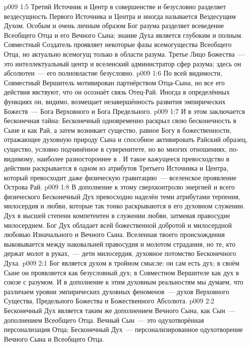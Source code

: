 \vs p009 1:5 \pc Третий Источник и Центр в совершенстве и безусловно разделяет вездесущность Первого Источника и Центра и иногда называется Вездесущим Духом. Особым и очень личным образом Бог разума разделяет всеведение Всеобщего Отца и его Вечного Сына; знание Духа является глубоким и полным. Совместный Создатель проявляет некоторые фазы всемогущества Всеобщего Отца, но актуально всемогущ только в области разума. Третье Лицо Божества~--- это интеллектуальный центр и вселенский администратор сфер разума; здесь он абсолютен~--- его полновластие безусловно.
\vs p009 1:6 По всей видимости, Совместный Вершитель мотивирован партнёрством Отца\hyp{}Сына, но все его действия явствуют, что он осознаёт связь Отец\hyp{}Рай. Иногда в определённых функциях он, видимо, возмещает незавершённость развития эмпирических Божеств~--- Бога Верховного и Бога Предельного.
\vs p009 1:7 \pc И в этом заключается бесконечная тайна: Бесконечный одновременно раскрыл свою бесконечность в Сыне и как Рай, а затем возникает существо, равное Богу в божественности, отражающее духовную природу Сына и способное активировать Райский образец, существо, условно подчинённое в суверенитете, но во многих отношениях, по\hyp{}видимому, наиболее разностороннее в . И такое кажущееся превосходство в действии раскрывается в одном из атрибутов Третьего Источника и Центра, который превосходит даже физическую гравитацию~--- вселенское проявление Острова Рай.
\vs p009 1:8 В дополнение к этому сверхконтролю энергией и всего физического Бесконечный Дух превосходно наделён теми атрибутами терпения, милосердия и любви, которые так тонко раскрываются в его духовном служении. Дух в высшей степени компетентен в служении любви, затмевая правосудие милосердием. Бог Дух обладает всей божественной добротой и милосердной любовью Изначального и Вечного Сына. Вселенная твоего происхождения выковывается между наковальней правосудия и молотом страдания, но те, кто держат молот в руках,~--- дети милосердия, духовное потомство Бесконечного Духа.
\vs p009 2:1 Бог является духом в тройном смысле: он сам есть дух; в своём Сыне он проявляется как безусловный дух; в Совместном Вершителе как дух в союзе с разумом. И в дополнение к этим духовным реальностям мы думаем, что различаем уровни эмпирических духовных феноменов~--- духов Верховного Существа, Предельного Божества и Божественного Абсолюта.
\vs p009 2:2 Бесконечный Дух является таким же дополнением Вечного Сына, как Сын~--- дополнением Всеобщего Отца. Вечный Сын~--- это одухотворённая персонализация Отца; Бесконечный Дух~--- персонализированное одухотворение Вечного Сына и Всеобщего Отца.
